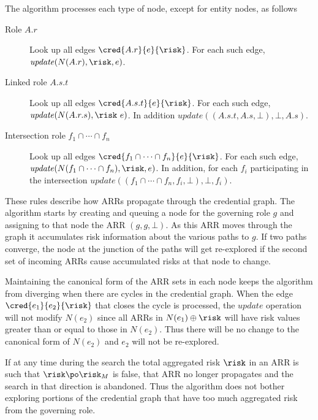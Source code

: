 The algorithm processes each type of node, except for entity nodes, as
follows
\begin{description}
\item[Role $A.r$] Look up all edges $\cred{A.r}{e}{\risk}$. For each
  such edge, $\mathit{update}(N(A.r), \risk, e)$.
\item[Linked role $A.s.t$] Look up all edges $\cred{A.s.t}{e}{\risk}$.
  For each such edge, $\mathit{update}(N(A.r.s), \risk\ e)$. In addition
  $\mathit{update}((A.s.t, A.s, \bot), \bot, A.s)$.
\item[Intersection role $f_1 \cap \cdots \cap f_n$] Look up all edges
  $\cred{f_1 \cap \cdots \cap f_n}{e}{\risk}$. For each such edge,
  $\mathit{update}(N(f_1 \cap \cdots \cap f_n), \risk, e)$. In addition,
  for each $f_i$ participating in the intersection $\mathit{update}((f_1
  \cap \cdots \cap f_n, f_i, \bot), \bot, f_i)$.
\end{description}

These rules describe how ARRs propagate through the credential graph.
The algorithm starts by creating and queuing a node for the governing
role $g$ and assigning to that node the ARR $(g, g, \bot)$. As this ARR
moves through the graph it accumulates risk information about the
various paths to $g$. If two paths converge, the node at the junction of
the paths will get re-explored if the second set of incoming ARRs cause
accumulated risks at that node to change.

Maintaining the canonical form of the ARR sets in each node keeps the
algorithm from diverging when there are cycles in the credential graph.
When the edge $\cred{e_1}{e_2}{\risk}$ that closes the cycle is
processed, the $\mathit{update}$ operation will not modify $N(e_2)$
since all ARRs in $N(e_1) \oplus \risk$ will have risk values greater
than or equal to those in $N(e_2)$. Thus there will be no change to the
canonical form of $N(e_2)$ and $e_2$ will not be re-explored.

If at any time during the search the total aggregated risk $\risk$ in an
ARR is such that $\risk \po \risk_M$ is false, that ARR no longer
propagates and the search in that direction is abandoned. Thus the
algorithm does not bother exploring portions of the credential graph
that have too much aggregated risk from the governing role.

